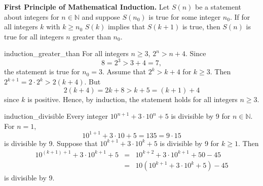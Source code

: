 \medskip

\noindent
{\bf First Principle of Mathematical Induction.} 
Let $S(n)$ be a statement about integers for  $n \in {\mathbb N}$ and suppose $S(n_0)$ is true for some integer $n_0$.  If for all integers $k$ with $k \geq n_0$ $S(k)$ implies that $S(k+1)$ is true, then $S(n)$ is true for all integers $n$ greater than $n_0$.  

\begin{example}{induction_greater_than}
For all integers $n \geq 3$, $2^n > n + 4$. Since
\[
8 = 2^3 > 3 + 4 = 7,
\]
the statement is true for $n_0 = 3$.  Assume that $2^k > k + 4$ for $k \geq 3$.  Then $2^{k + 1} = 2 \cdot 2^{k} > 2(k + 4)$.  But 
\[
2(k + 4) = 2k + 8 > k + 5 = (k + 1) + 4
\]
since $k$ is positive.  Hence, by induction, the statement holds for all integers $n \geq 3$. 
\end{example}

\begin{example}{induction_divisible}
Every integer $10^{n + 1} + 3 \cdot 10^n + 5$ is divisible by 9 for $n \in {\mathbb N}$.  For $n = 1$, 
\[
10^{1 + 1} + 3 \cdot 10 + 5 = 135 = 9 \cdot 15
\]
is divisible by 9.  Suppose that $10^{k + 1} + 3 \cdot 10^k + 5$ is divisible by 9 for $k \geq 1$.  Then 
\begin{eqnarray*}
10^{(k + 1) + 1} + 3 \cdot 10^{k + 1} + 5
& = &
10^{k + 2} + 3 \cdot 10^{k + 1} + 50 - 45 \\
& = &
10 (10^{k + 1} + 3 \cdot 10^{k} + 5) - 45
\end{eqnarray*}
is divisible by 9.
\end{example}

